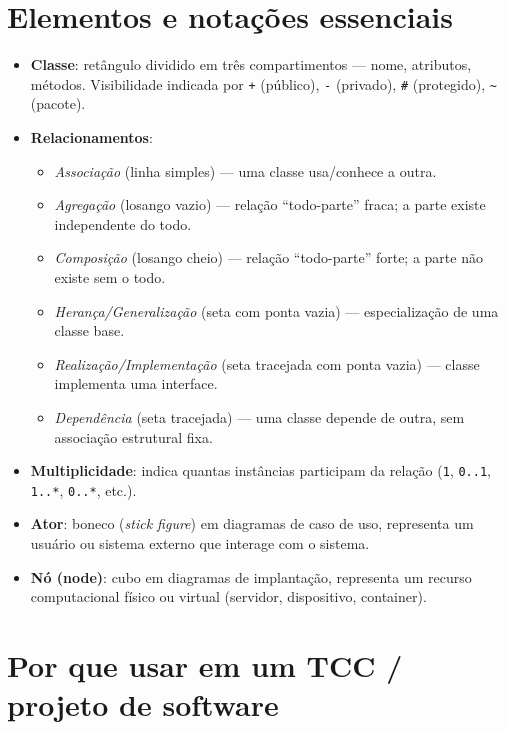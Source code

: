 \documentclass[11pt,a4paper]{article}
\begin{document}
\section*{Elementos e notações essenciais}

\begin{itemize}
  \item \textbf{Classe}: retângulo dividido em três compartimentos ---
    nome, atributos, métodos. Visibilidade indicada por \texttt{+}
    (público), \texttt{-} (privado), \texttt{\#} (protegido), \texttt{\~{}}
    (pacote).
  \item \textbf{Relacionamentos}:
  \begin{itemize}
    \item \emph{Associação} (linha simples) --- uma classe usa/conhece a outra.
    \item \emph{Agregação} (losango vazio) --- relação ``todo-parte'' fraca;
      a parte existe independente do todo.
    \item \emph{Composição} (losango cheio) --- relação ``todo-parte''
      forte; a parte não existe sem o todo.
    \item \emph{Herança/Generalização} (seta com ponta vazia) ---
      especialização de uma classe base.
    \item \emph{Realização/Implementação} (seta tracejada com ponta vazia)
      --- classe implementa uma interface.
    \item \emph{Dependência} (seta tracejada) --- uma classe depende de
      outra, sem associação estrutural fixa.
  \end{itemize}
  \item \textbf{Multiplicidade}: indica quantas instâncias participam da
    relação (\texttt{1}, \texttt{0..1}, \texttt{1..*}, \texttt{0..*}, etc.).
  \item \textbf{Ator}: boneco (\emph{stick figure}) em diagramas de caso de
    uso, representa um usuário ou sistema externo que interage com o
    sistema.
  \item \textbf{Nó (node)}: cubo em diagramas de implantação, representa um
    recurso computacional físico ou virtual (servidor, dispositivo,
    container).
\end{itemize}

\section*{Por que usar em um TCC / projeto de software}
\end{document}
